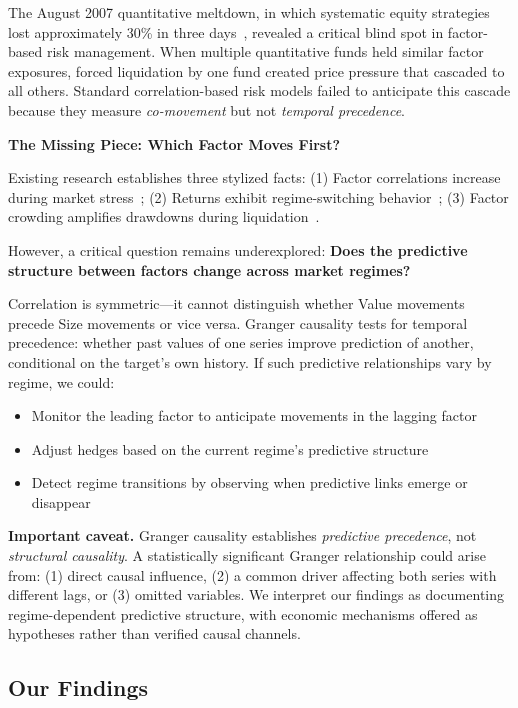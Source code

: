 \documentclass[sigconf]{acmart}
\begin{document}
The August 2007 quantitative meltdown, in which systematic equity strategies lost
approximately 30\% in three days~\cite{khandani2011quants}, revealed a critical
blind spot in factor-based risk management.
When multiple quantitative funds held similar factor exposures, forced liquidation
by one fund created price pressure that cascaded to all others.
Standard correlation-based risk models failed to anticipate this cascade because they
measure \emph{co-movement} but not \emph{temporal precedence}.

\textbf{The Missing Piece: Which Factor Moves First?}

Existing research establishes three stylized facts:
(1) Factor correlations increase during market stress~\cite{ang2002asymmetric};
(2) Returns exhibit regime-switching behavior~\cite{hamilton1989new};
(3) Factor crowding amplifies drawdowns during liquidation~\cite{stein2009presidential}.

However, a critical question remains underexplored: \textbf{Does the predictive
structure between factors change across market regimes?}

Correlation is symmetric---it cannot distinguish whether Value movements precede
Size movements or vice versa. Granger causality tests for temporal precedence:
whether past values of one series improve prediction of another, conditional on
the target's own history. If such predictive relationships vary by regime, we could:
\begin{itemize}
    \item Monitor the leading factor to anticipate movements in the lagging factor
    \item Adjust hedges based on the current regime's predictive structure
    \item Detect regime transitions by observing when predictive links emerge or disappear
\end{itemize}

\textbf{Important caveat.} Granger causality establishes \emph{predictive precedence},
not \emph{structural causality}. A statistically significant Granger relationship
could arise from: (1) direct causal influence, (2) a common driver affecting both
series with different lags, or (3) omitted variables. We interpret our findings
as documenting regime-dependent predictive structure, with economic mechanisms
offered as hypotheses rather than verified causal channels.

\subsection{Our Findings}
\end{document}
